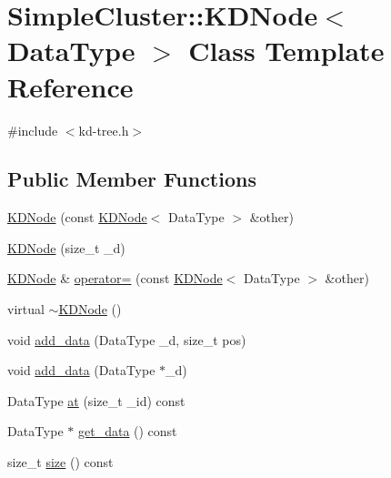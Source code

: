 \hypertarget{classSimpleCluster_1_1KDNode}{\section{Simple\+Cluster\+:\+:K\+D\+Node$<$ Data\+Type $>$ Class Template Reference}
\label{classSimpleCluster_1_1KDNode}
}


{\ttfamily \#include $<$kd-\/tree.\+h$>$}

\subsection*{Public Member Functions}
\begin{DoxyCompactItemize}
\item 
\hyperlink{classSimpleCluster_1_1KDNode_a1722141bf4dab3bb456e0a119c61f4eb}{K\+D\+Node} (const \hyperlink{classSimpleCluster_1_1KDNode}{K\+D\+Node}$<$ Data\+Type $>$ \&other)
\item 
\hyperlink{classSimpleCluster_1_1KDNode_a34f813a9d53845f25ff11f1f3fad9ea9}{K\+D\+Node} (size\+\_\+t \+\_\+d)
\item 
\hyperlink{classSimpleCluster_1_1KDNode}{K\+D\+Node} \& \hyperlink{classSimpleCluster_1_1KDNode_a7719d6922448ee1c3c4f777117ce48a0}{operator=} (const \hyperlink{classSimpleCluster_1_1KDNode}{K\+D\+Node}$<$ Data\+Type $>$ \&other)
\item 
virtual \hyperlink{classSimpleCluster_1_1KDNode_a997a7e9b6cb385f9a8978a081244f34b}{$\sim$\+K\+D\+Node} ()
\item 
void \hyperlink{classSimpleCluster_1_1KDNode_a677b5c80b8c79d90df3a154bed0f852e}{add\+\_\+data} (Data\+Type \+\_\+d, size\+\_\+t pos)
\item 
void \hyperlink{classSimpleCluster_1_1KDNode_ae298e978e3ee74d2e005cc2c444092d8}{add\+\_\+data} (Data\+Type $\ast$\+\_\+d)
\item 
Data\+Type \hyperlink{classSimpleCluster_1_1KDNode_a95bf12176f7791462ba64761261ce571}{at} (size\+\_\+t \+\_\+id) const 
\item 
Data\+Type $\ast$ \hyperlink{classSimpleCluster_1_1KDNode_a8e4425575a97ed7dafd0e54f859ceaf8}{get\+\_\+data} () const 
\item 
size\+\_\+t \hyperlink{classSimpleCluster_1_1KDNode_a8dac1174c6fc18b1403e378d5e501916}{size} () const 
\end{DoxyCompactItemize}
